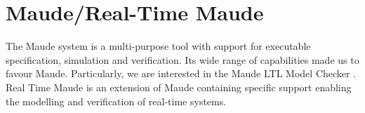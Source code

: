 \section{Maude/Real-Time Maude}

The Maude system \cite{MC03} is a multi-purpose tool with support for
executable specification, simulation and verification.
%
%
Its wide range of capabilities made us to favour Maude. Particularly,
we are interested in the Maude LTL Model Checker \cite{ES00}.  Real
Time Maude \cite{PO07b} is an extension of Maude containing specific
support enabling the modelling and verification of
%
%
real-time systems.
%
%

